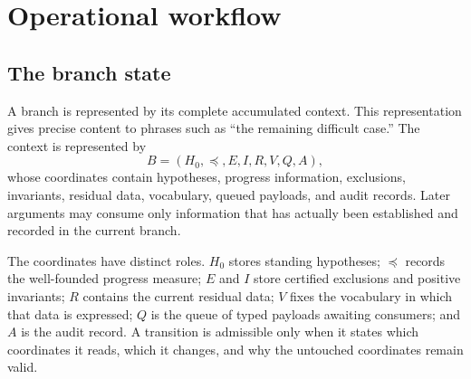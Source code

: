 \documentclass[11pt]{article}
\begin{document}
\section{Operational workflow}
\subsection{The branch state}
A branch is represented by its complete accumulated context. This representation gives precise content to phrases such as “the remaining difficult case.”
The context is represented by
\[
B=(H_0,\preceq,E,I,R,V,Q,A),
\]
whose coordinates contain hypotheses, progress information, exclusions,
invariants, residual data, vocabulary, queued payloads, and audit records.
Later arguments may consume only information that has actually been established and recorded in the current branch.

The coordinates have distinct roles. \(H_0\) stores standing hypotheses;
\(\preceq\) records the well-founded progress measure; \(E\) and \(I\) store
certified exclusions and positive invariants; \(R\) contains the current
residual data; \(V\) fixes the vocabulary in which that data is expressed;
\(Q\) is the queue of typed payloads awaiting consumers; and \(A\) is the
audit record. A transition is admissible only when it states which coordinates
it reads, which it changes, and why the untouched coordinates remain valid.
\end{document}

